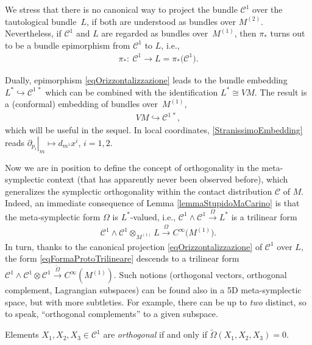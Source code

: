 \documentclass[pdftex]{sigma}
\newcommand{\C}{\mathcal{C}}
\numberwithin{equation}{section}
\begin{document}
We stress that there is no canonical way to project the bundle $\C^1$ over the tautological bundle~$L$, if both are understood as bundles over $M^{(2)}$. Nevertheless, if $\C^1$ and $L$ are regarded as bundles over~$M^{(1)}$, then $\pi_*$ turns out to be a bundle epimorphism from $\C^1$ to $L$, i.e.,
 \begin{gather}\label{eqOrizzontalizzazione}
 \pi_*\colon\ \C^1\longrightarrow L=\pi_*\big(\C^1\big).
\end{gather}

Dually, epimorphism \eqref{eqOrizzontalizzazione} leads to the bundle embedding $L^\ast \hookrightarrow \C^{1\,\ast}$ which can be combined with the identif\/ication $L^\ast\cong VM$. The result is a (conformal) embedding of bundles over~$M^{(1)}$,
\begin{gather}\label{StranissimoEmbedding}
VM\hookrightarrow \C^{1\,\ast},
\end{gather}
which will be useful in the sequel.
In local coordinates, \eqref{StranissimoEmbedding} reads
$
\left. \partial_{p_i} \right|_{m}\longmapsto d_{m^1}x^i$, $ i=1,2
$.

Now we are in position to def\/ine the concept of orthogonality in the meta-symplectic context
(that has apparently never been observed before), which
generalizes the symplectic orthogonality within the contact distribution $\C$ of $M$. Indeed, an immediate consequence of Lemma \ref{lemmaStupidoMaCarino} is that
the meta-symplectic form $\Omega$ is $L^\ast$-valued, i.e., $\C^1\wedge\C^1\stackrel{\Omega}{\longrightarrow}L^\ast$ is a trilinear form
\begin{gather}\label{eqFormaProtoTrilineare}
\C^1\wedge\C^1\otimes_{M^{(1)}}L\stackrel{\Omega}{\longrightarrow}C^\infty\big(M^{(1)}\big).
\end{gather}
In turn, thanks to
the canonical projection \eqref{eqOrizzontalizzazione} of $\C^1$ over $L$, the form \eqref{eqFormaProtoTrilineare} descends to a
trilinear form $\C^1\wedge\C^1\otimes \C^1\stackrel{\widetilde{\Omega}}{\longrightarrow}C^\infty(M^{(1)})$.
Such notions (orthogonal vectors, orthogonal complement, Lagrangian subspaces) can be found also in a 5D meta-symplectic space, but with more subtleties. For example, there can be up to \emph{two} distinct, so to speak, ``orthogonal complements'' to a given subspace.

\begin{Definition}\label{defTriOrt}
Elements $X_1,X_2,X_3\in \C^1$ are \emph{orthogonal} if and only if
$\widetilde{\Omega}(X_1,X_2,X_3)=0$.
\end{Definition}
\end{document}
